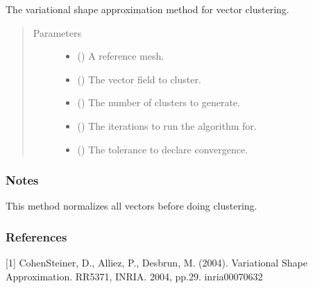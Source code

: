 \documentclass[letterpaper,10pt,english]{sphinxmanual}
\begin{document}
\begin{fulllineitems}
\label{\detokenize{api/generated/directional_clustering.clustering.VariationalKMeans:directional_clustering.clustering.VariationalKMeans}}
The variational shape approximation method for vector clustering.
\begin{quote}\begin{description}
\item[{Parameters}] \leavevmode\begin{itemize}
\item {} 
 () \textendash{} A reference mesh.

\item {} 
 () \textendash{} The vector field to cluster.

\item {} 
 () \textendash{} The number of clusters to generate.

\item {} 
 () \textendash{} The iterations to run the algorithm for.

\item {} 
 () \textendash{} The tolerance to declare convergence.

\end{itemize}

\end{description}\end{quote}
\subsubsection*{Notes}

This method normalizes all vectors before doing clustering.
\subsubsection*{References}

{[}1{]} Cohen\sphinxhyphen{}Steiner, D., Alliez, P., Desbrun, M. (2004). Variational Shape Approximation.
RR\sphinxhyphen{}5371, INRIA. 2004, pp.29. inria\sphinxhyphen{}00070632

\end{fulllineitems}
\end{document}
